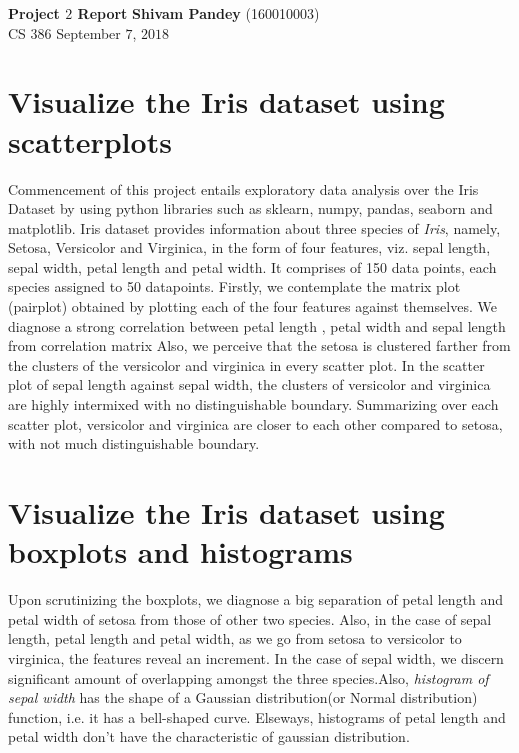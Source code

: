 \documentclass[a4paper, 12pt]{article}
\begin{document}
\noindent
\large\textbf{Project $2$ Report} \hfill \textbf{Shivam 
Pandey} (160010003) \\ %
\normalsize CS $386$ \hfill September $7$, $2018$

 
\section{Visualize the Iris dataset using 
scatterplots}
Commencement of this project entails exploratory data analysis over the Iris Dataset by using python libraries such as sklearn, numpy, pandas, seaborn and matplotlib. Iris dataset provides information about three species of \textit {Iris}, namely, Setosa, Versicolor and Virginica, in the form of four features, viz. sepal length, sepal width, petal length and petal width. It comprises of 150 data points, each species assigned to 50 datapoints. Firstly, we contemplate the matrix plot (pairplot) obtained by plotting each of the four features against themselves. We diagnose a strong correlation between petal length , petal width and sepal length from correlation matrix  Also, we perceive that the setosa is clustered farther from the clusters of the versicolor and virginica in every scatter plot. In the scatter plot of sepal length against sepal width, the clusters of versicolor and virginica are highly intermixed with no distinguishable boundary. Summarizing over each scatter plot, versicolor and virginica are closer to each other compared to setosa, with not much distinguishable boundary.

\section{Visualize the Iris dataset using boxplots and 
histograms}

Upon scrutinizing the boxplots, we diagnose a big separation of petal length and petal width of setosa from those of other two species. Also, in the case of sepal length, petal length and petal width, as we go from setosa to versicolor to virginica, the features reveal an increment. In the case of sepal width, we discern significant amount of overlapping amongst the three species.Also, \emph{histogram of sepal width} has the shape of a Gaussian distribution(or Normal distribution) function, i.e. it has a bell-shaped curve. Elseways, histograms of petal length and petal width don't have the characteristic of gaussian distribution. 
\end{document}
